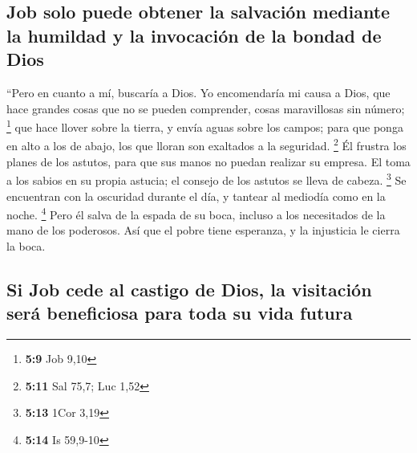 \hypertarget{job-solo-puede-obtener-la-salvaciuxf3n-mediante-la-humildad-y-la-invocaciuxf3n-de-la-bondad-de-dios}{%
\subsection{Job solo puede obtener la salvación mediante la humildad y
la invocación de la bondad de
Dios}\label{job-solo-puede-obtener-la-salvaciuxf3n-mediante-la-humildad-y-la-invocaciuxf3n-de-la-bondad-de-dios}}

 ``Pero en cuanto a mí, buscaría a Dios. Yo encomendaría
mi causa a Dios,  que hace grandes cosas que no se pueden
comprender, cosas maravillosas sin número; \footnote{\textbf{5:9} Job
  9,10}  que hace llover sobre la tierra, y envía aguas
sobre los campos;  para que ponga en alto a los de abajo,
los que lloran son exaltados a la seguridad. \footnote{\textbf{5:11} Sal
  75,7; Luc 1,52}  Él frustra los planes de los astutos,
para que sus manos no puedan realizar su empresa.  El
toma a los sabios en su propia astucia; el consejo de los astutos se
lleva de cabeza. \footnote{\textbf{5:13} 1Cor 3,19}  Se
encuentran con la oscuridad durante el día, y tantear al mediodía como
en la noche. \footnote{\textbf{5:14} Is 59,9-10}  Pero él
salva de la espada de su boca, incluso a los necesitados de la mano de
los poderosos.  Así que el pobre tiene esperanza, y la
injusticia le cierra la boca.

\hypertarget{si-job-cede-al-castigo-de-dios-la-visitaciuxf3n-seruxe1-beneficiosa-para-toda-su-vida-futura}{%
\subsection{Si Job cede al castigo de Dios, la visitación será
beneficiosa para toda su vida
futura}\label{si-job-cede-al-castigo-de-dios-la-visitaciuxf3n-seruxe1-beneficiosa-para-toda-su-vida-futura}}


